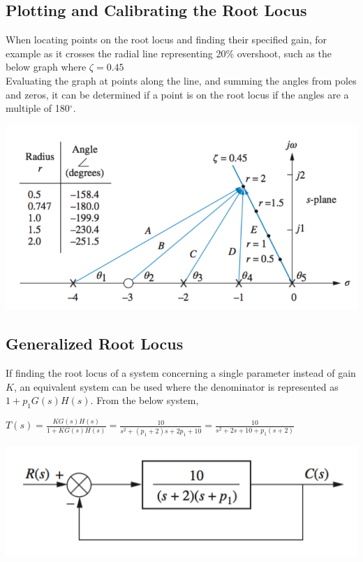 \documentclass[11pt]{article}
\begin{document}
    \subsection{Plotting and Calibrating the Root Locus}

    When locating points on the root locus and finding their specified gain, for example as it crosses the radial line representing 20\% overshoot, such as the below graph where $\zeta = 0.45$ \\ 

    Evaluating the graph at points along the line, and summing the angles from poles and zeros, it can be determined if a point is on the root locus if the angles are a multiple of 180$^\circ$.

    \begin{center}
        \includegraphics[width=300 px]{img/calibrating} \\
    \end{center}  

    \subsection{Generalized Root Locus}

    If finding the root locus of a system concerning a single parameter instead of gain $K$, an equivalent system can be used where the denominator is represented as $1 + p_1G(s)H(s)$. From the below system,\\ 
    \begin{center}
    $T(s) = \frac{KG(s)H(s)}{1 + KG(s)H(s)} = \frac{10}{s^2 + (p_1 +2)s + 2p_1 + 10} = \frac{10}{s^2 + 2s + 10 + p_1(s + 2)}$
    \end{center}

    \begin{center}
        \includegraphics[width=300 px]{img/parameter1} \\
    \end{center}  
\end{document}
